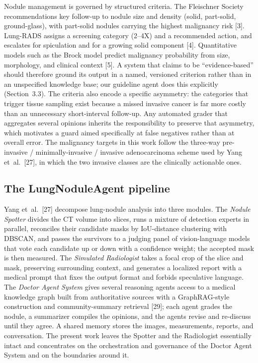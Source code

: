 \documentclass[12pt]{article}
\begin{document}
Nodule management is governed by structured criteria. The Fleischner Society recommendations key follow-up to nodule size and density (solid, part-solid, ground-glass), with part-solid nodules carrying the highest malignancy risk [3]. Lung-RADS assigns a screening category (2--4X) and a recommended action, and escalates for spiculation and for a growing solid component [4]. Quantitative models such as the Brock model predict malignancy probability from size, morphology, and clinical context [5]. A system that claims to be \enquote{evidence-based} should therefore ground its output in a named, versioned criterion rather than in an unspecified knowledge base; our guideline agent does this explicitly (Section~3.3). The criteria also encode a specific asymmetry: the categories that trigger tissue sampling exist because a missed invasive cancer is far more costly than an unnecessary short-interval follow-up. Any automated grader that aggregates several opinions inherits the responsibility to preserve that asymmetry, which motivates a guard aimed specifically at false negatives rather than at overall error. The malignancy targets in this work follow the three-way pre-invasive / minimally-invasive / invasive adenocarcinoma scheme used by Yang et~al.~[27], in which the two invasive classes are the clinically actionable ones.

\subsection{The LungNoduleAgent pipeline}

Yang et~al.~[27] decompose lung-nodule analysis into three modules. The \emph{Nodule Spotter} divides the CT volume into slices, runs a mixture of detection experts in parallel, reconciles their candidate masks by IoU-distance clustering with DBSCAN, and passes the survivors to a judging panel of vision-language models that vote each candidate up or down with a confidence weight; the accepted mask is then measured. The \emph{Simulated Radiologist} takes a focal crop of the slice and mask, preserving surrounding context, and generates a localized report with a medical prompt that fixes the output format and forbids speculative language. The \emph{Doctor Agent System} gives several reasoning agents access to a medical knowledge graph built from authoritative sources with a GraphRAG-style construction and community-summary retrieval [29]; each agent grades the nodule, a summarizer compiles the opinions, and the agents revise and re-discuss until they agree. A shared memory stores the images, measurements, reports, and conversation. The present work leaves the Spotter and the Radiologist essentially intact and concentrates on the orchestration and governance of the Doctor Agent System and on the boundaries around it.
\end{document}
